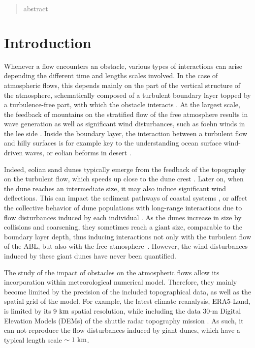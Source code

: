 \begin{abstract}
  abstract
\end{abstract}

\newpage

\section{Introduction}

Whenever a flow encounters an obstacle, various types of interactions can arise depending the different time and lengths scales involved. In the case of atmospheric flows, this depends mainly on the part of the vertical structure of the atmosphere, schematically composed of a turbulent boundary layer topped by a turbulence-free part, with which the obstacle interacts \citep{Stull1988}.
%
At the largest scale, the feedback of mountains on the stratified flow of the free atmosphere results in wave generation as well as significant wind disturbances, such as foehn winds in the lee side \citep{refs}. Inside the boundary layer, the interaction between a turbulent flow and hilly surfaces is for example key to the understanding ocean surface wind-driven waves, or eolian beforms in desert \citep{Belcher1998, Sullivan2010, Courrech2015}.

Indeed, eolian sand dunes typically emerge from the feedback of the topography on the turbulent flow, which speeds up close to the dune crest \citep{Rubin1987, Charru2013, Courrech2014}. Later on, when the dune reaches an intermediate size, it may also induce significant wind deflections. This can impact the sediment pathways of coastal systems \citep{Hesp2015}, or affect the collective behavior of dune populations with long-range interactions due to flow disturbances induced by each individual \citep{Smith2017, Bacik2020}. As the dunes increase in size by collisions and coarsening, they sometimes reach a giant size, comparable to the boundary layer depth, thus inducing interactions not only with the turbulent flow of the ABL, but also with the free atmosphere~\citep{andreotti2009}. However, the wind disturbances induced by these giant dunes have never been quantified.

The study of the impact of obstacles on the atmospheric flows allow its incorporation within meteorological numerical model. Therefore, they mainly become limited by the precision of the included topographical data, as well as the spatial grid of the model. For example, the latest climate reanalysis, ERA5-Land, is limited by its $9~\textup{km}$ spatial resolution, while including the data $30$-m Digital Elevation Models (DEMs) of the shuttle radar topography mission \citep{Farr2007, munoz2021}. As such, it can not reproduce the flow disturbances induced by giant dunes, which have a typical length scale $\sim 1~\textup{km}$.

